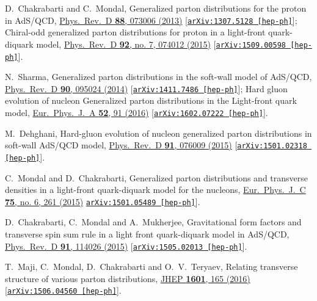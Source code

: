 \documentclass[aps,prd,preprint,groupedaddress]{revtex4-1}
\begin{document}
\begin{thebibliography}{99}
  D.~Chakrabarti and C.~Mondal,
  Generalized parton distributions for the proton in AdS/QCD,
  \href{https://journals.aps.org/prd/abstract/10.1103/PhysRevD.88.073006}{Phys.\ Rev.\ D {\bf 88},  073006 (2013)}
  [\href{https://arxiv.org/abs/1307.5128}{\tt arXiv:1307.5128 [hep-ph]}];
  Chiral-odd generalized parton distributions for proton in a light-front quark-diquark model,
  \href{https://journals.aps.org/prd/abstract/10.1103/PhysRevD.92.074012}{Phys.\ Rev.\ D {\bf 92}, no. 7, 074012 (2015)}
  [\href{https://arxiv.org/abs/1509.00598}{\tt arXiv:1509.00598 [hep-ph]}].


  N.~Sharma,
  Generalized parton distributions in the soft-wall model of AdS/QCD,
  \href{https://journals.aps.org/prd/abstract/10.1103/PhysRevD.90.095024}{Phys.\ Rev.\ D {\bf 90}, 095024 (2014)}
  [\href{https://arxiv.org/abs/1411.7486}{\tt arXiv:1411.7486 [hep-ph]}];
  Hard gluon evolution of nucleon Generalized parton distributions in the Light-front quark model,
  \href{https://link.springer.com/article/10.1140%2Fepja%2Fi2016-16091-4}{Eur.\ Phys.\ J.\ A {\bf 52}, 91 (2016)}
  [\href{https://arxiv.org/abs/1602.07222}{\tt arXiv:1602.07222 [hep-ph]}].


  M.~Dehghani,
  Hard-gluon evolution of nucleon generalized parton distributions in soft-wall AdS/QCD model,
  \href{https://journals.aps.org/prd/abstract/10.1103/PhysRevD.91.076009}{Phys.\ Rev.\ D {\bf 91}, 076009 (2015)}
  [\href{https://arxiv.org/abs/1501.02318}{\tt arXiv:1501.02318 [hep-ph]}].


  C.~Mondal and D.~Chakrabarti,
  Generalized parton distributions and transverse densities in a light-front quark-diquark model for the nucleons,
  \href{https://link.springer.com/article/10.1140%2Fepjc%2Fs10052-015-3486-6}{Eur.\ Phys.\ J.\ C {\bf 75}, no. 6, 261 (2015)}
  \href{https://arxiv.org/abs/1501.05489}{\tt arXiv:1501.05489 [hep-ph]}].


  D.~Chakrabarti, C.~Mondal and A.~Mukherjee,
  Gravitational form factors and transverse spin sum rule in a light front quark-diquark model in AdS/QCD,
  \href{https://journals.aps.org/prd/abstract/10.1103/PhysRevD.91.114026}{Phys.\ Rev.\ D {\bf 91}, 114026 (2015)}
  [\href{https://arxiv.org/abs/1505.02013}{\tt arXiv:1505.02013 [hep-ph]}].


  T.~Maji, C.~Mondal, D.~Chakrabarti and O.~V.~Teryaev,
  Relating transverse structure of various parton distributions,
  \href{https://link.springer.com/article/10.1007%2FJHEP01%282016%29165}{JHEP {\bf 1601}, 165 (2016)}
  [\href{https://arxiv.org/abs/1506.04560}{\tt arXiv:1506.04560 [hep-ph]}].



\end{thebibliography}
\end{document}
